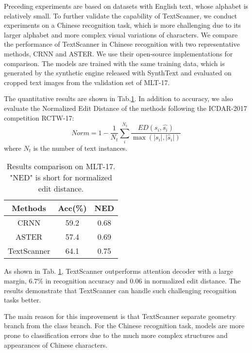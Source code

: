 \documentclass[letterpaper]{article} \usepackage{aaai20}  \usepackage{times}  \usepackage{helvet} \usepackage{courier}  \usepackage[hyphens]{url}  \usepackage{graphicx} \urlstyle{rm} \def\UrlFont{\rm}  \usepackage{graphicx}  \frenchspacing  \setlength{\pdfpagewidth}{8.5in}  \setlength{\pdfpageheight}{11in}
\begin{document}
Preceding experiments are based on datasets with English text, whose alphabet is relatively small. To further validate the capability of TextScanner, we conduct experiments on a Chinese recognition task, which is more challenging due to its larger alphabet and more complex visual variations of characters.
We compare the performance of TextScanner in Chinese recognition with two representative methods, CRNN\cite{shi2017end} and ASTER\cite{aster}. We use their open-source implementations for comparison. The models are trained with the same training data, which is generated by the synthetic engine released with SynthText and evaluated on cropped text images from the validation set of MLT-17.

The quantitative results are shown in Tab.\ref{tab:Chinese}. In addition to accuracy, we also evaluate the Normalized Edit Distance of the methods following the ICDAR-2017 competition RCTW-17\cite{shi2017icdar2017}:
\begin{equation}
    Norm = 1 - \frac{1}{N_{t}}\sum_{i}^{N_{t}}{\frac{ED(s_{i}, \hat{s_{i}})}{\max(|s_{i}|, |\hat{s}_{i}|)}}
\end{equation}
where $N_t$ is the number of text instances.

\begin{table}[!t]
\centering
    \begin{tabular}{|c|c|c|}
    \hline
    \textbf{Methods} & Acc(\%) & NED \\
    \hline
    CRNN\tiny\cite{shi2017end} & 59.2 & 0.68 \\
    ASTER\tiny\cite{aster} & 57.4 & 0.69 \\
    TextScanner & 64.1 & 0.75 \\
    \hline
    \end{tabular}
\caption{Results comparison on MLT-17. "NED" is short for normalized edit distance.}
\label{tab:Chinese}
\end{table}

As shown in Tab. \ref{tab:Chinese}, TextScanner outperforms attention decoder with a large margin, $6.7\%$ in recognition accuracy and $0.06$ in normalized edit distance. The results demonstrate that TextScanner can handle such challenging recognition tasks better.

The main reason for this improvement is that TextScanner separate geometry branch from the class branch. For the Chinese recognition task, models are more prone to classification errors due to the much more complex structures and appearances of Chinese characters.
\end{document}
